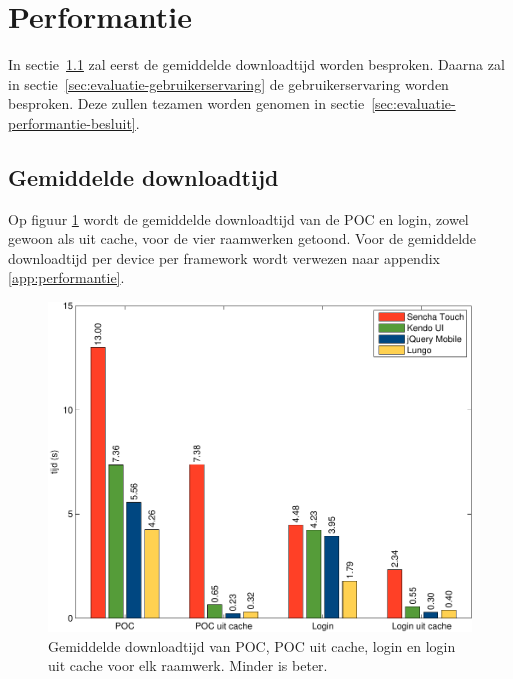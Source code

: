 \section{Performantie}
\label{sec:evaluatie-performantie}

In sectie~\ref{sec:evaluatie-downloadtijd} zal eerst de gemiddelde downloadtijd worden besproken.
Daarna zal in sectie~\ref{sec:evaluatie-gebruikerservaring} de gebruikerservaring worden besproken.
Deze zullen tezamen worden genomen in sectie~\ref{sec:evaluatie-performantie-besluit}.


\subsection{Gemiddelde downloadtijd}
\label{sec:evaluatie-downloadtijd}

Op figuur \ref{fig:performantie} wordt de gemiddelde downloadtijd van de POC en login, zowel gewoon als uit cache, voor de vier raamwerken getoond.
Voor de gemiddelde downloadtijd per device per framework wordt verwezen naar appendix \ref{app:performantie}.

\begin{figure}[H]
  \centering
  \includegraphics[width=\textwidth]{figuren/performance.pdf}
  \caption{Gemiddelde downloadtijd van POC,  POC uit cache,  login en login uit cache voor elk raamwerk. Minder is beter.}
  \label{fig:performantie}
\end{figure}

